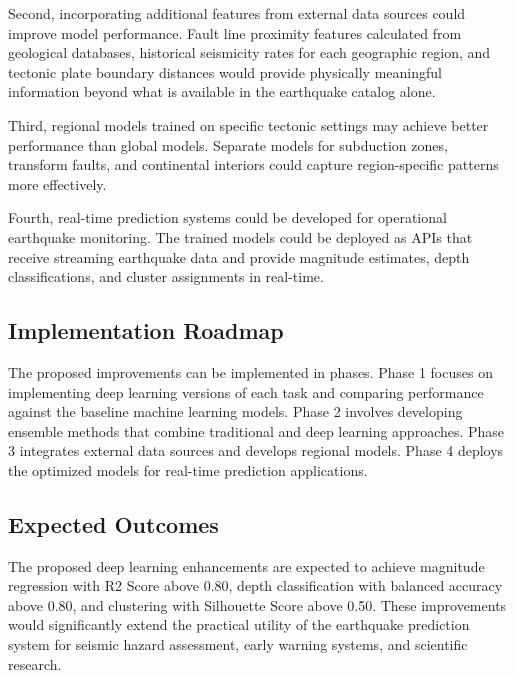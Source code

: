 Second, incorporating additional features from external data sources could improve model performance. Fault line proximity features calculated from geological databases, historical seismicity rates for each geographic region, and tectonic plate boundary distances would provide physically meaningful information beyond what is available in the earthquake catalog alone.

Third, regional models trained on specific tectonic settings may achieve better performance than global models. Separate models for subduction zones, transform faults, and continental interiors could capture region-specific patterns more effectively.

Fourth, real-time prediction systems could be developed for operational earthquake monitoring. The trained models could be deployed as APIs that receive streaming earthquake data and provide magnitude estimates, depth classifications, and cluster assignments in real-time.

\subsection{Implementation Roadmap}

The proposed improvements can be implemented in phases. Phase 1 focuses on implementing deep learning versions of each task and comparing performance against the baseline machine learning models. Phase 2 involves developing ensemble methods that combine traditional and deep learning approaches. Phase 3 integrates external data sources and develops regional models. Phase 4 deploys the optimized models for real-time prediction applications.

\subsection{Expected Outcomes}

The proposed deep learning enhancements are expected to achieve magnitude regression with R2 Score above 0.80, depth classification with balanced accuracy above 0.80, and clustering with Silhouette Score above 0.50. These improvements would significantly extend the practical utility of the earthquake prediction system for seismic hazard assessment, early warning systems, and scientific research.
